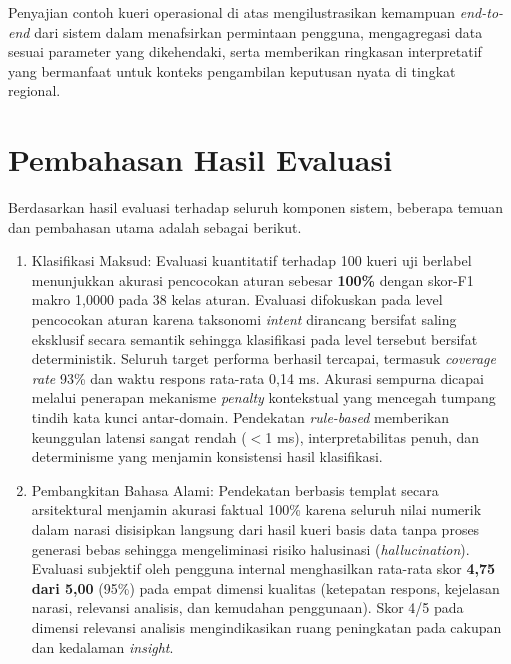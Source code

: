 Penyajian contoh kueri operasional di atas mengilustrasikan kemampuan \textit{end-to-end} dari sistem dalam menafsirkan permintaan pengguna, mengagregasi data sesuai parameter yang dikehendaki, serta memberikan ringkasan interpretatif yang bermanfaat untuk konteks pengambilan keputusan nyata di tingkat regional.

\section{Pembahasan Hasil Evaluasi}
\label{sec:pembahasan-eval}

Berdasarkan hasil evaluasi terhadap seluruh komponen sistem, beberapa temuan dan pembahasan utama adalah sebagai berikut.

\begin{enumerate}
    \item Klasifikasi Maksud: Evaluasi kuantitatif terhadap 100 kueri uji berlabel menunjukkan akurasi pencocokan aturan sebesar \textbf{100\%} dengan skor-F1 makro 1{,}0000 pada 38 kelas aturan. Evaluasi difokuskan pada level pencocokan aturan karena taksonomi \textit{intent} dirancang bersifat saling eksklusif secara semantik sehingga klasifikasi pada level tersebut bersifat deterministik. Seluruh target performa berhasil tercapai, termasuk \textit{coverage rate} 93\% dan waktu respons rata-rata 0{,}14 ms. Akurasi sempurna dicapai melalui penerapan mekanisme \textit{penalty} kontekstual yang mencegah tumpang tindih kata kunci antar-domain. Pendekatan \textit{rule-based} memberikan keunggulan latensi sangat rendah ($<$1 ms), interpretabilitas penuh, dan determinisme yang menjamin konsistensi hasil klasifikasi.

    \item Pembangkitan Bahasa Alami: Pendekatan berbasis templat secara arsitektural menjamin akurasi faktual 100\% karena seluruh nilai numerik dalam narasi disisipkan langsung dari hasil kueri basis data tanpa proses generasi bebas sehingga mengeliminasi risiko halusinasi (\textit{hallucination}). Evaluasi subjektif oleh pengguna internal menghasilkan rata-rata skor \textbf{4{,}75 dari 5{,}00} (95\%) pada empat dimensi kualitas (ketepatan respons, kejelasan narasi, relevansi analisis, dan kemudahan penggunaan). Skor 4/5 pada dimensi relevansi analisis mengindikasikan ruang peningkatan pada cakupan dan kedalaman \textit{insight}.


\end{enumerate}

